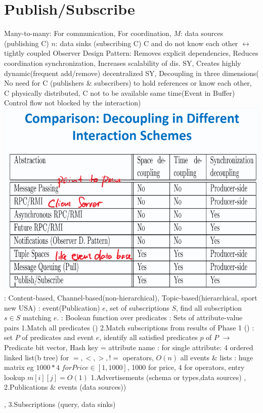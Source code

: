 \section{Publish/Subscribe}
Many-to-many:
For communication,
For coordination,
$M$: data sources (publishing C) $n$: data sinks (subscribing C)
C  and do not know each other $\leftrightarrow$ tightly coupled Observer Design Pattern:
Removes explicit dependencies, 
Reduces coordination synchronization, 
Increases scalability of dis. SY,
Creates highly dynamic(frequent add/remove) decentralized SY,
Decoupling in three dimensions(
No need for C (publishers \& subscribers) to hold references or know each other, C physically distributed,
C not to be available same time(Event in Buffer)
Control flow not blocked by the interaction)
\includegraphics[width=\linewidth]{chap9_1.png}
: Content-based, Channel-based(non-hierarchical), Topic-based(hierarchical, sport new USA)
:
event(Publication) $e$, set of subscriptions $S$, find all subscription $s\in S$ matching $e$.
: Boolean function over predicates
: Sets of attribute-value pairs
1.Match all predicates ()
2.Match subscriptions from results of Phase 1 ()
:  set $P$ of predicates and event $e$, 
identify all satisfied predicates $p$ of $P$ $\rightarrow$ Predicate bit vector,
Hash key = attribute name
: for single attribute: 4 ordered linked list(b tree) for $=, <, >, !=$ operators, $O(n)$ all events \& lists
: huge matrix eg $1000 * 4\;for Price \in [1, 1000]$,
1000 for price, 4 for operators, entry lookup $m[i][j]=O(1)$
\textbar
{}
1.Advertisements (schema or types,data sources) ,
2.Publications \& events (data sources))
\begin{CJK*}{UTF8}{gbsn}
\end{CJK*},
3.Subscriptions (query, data sinks)

